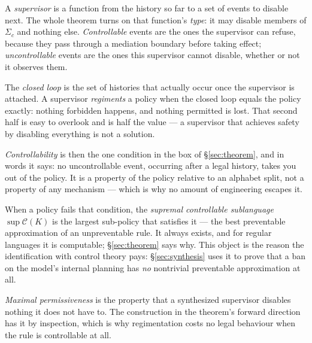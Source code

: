 \documentclass[11pt,a4paper]{article}  \usepackage{mdframed} \usepackage{graphicx} \usepackage{tabularx}
\begin{document}
A \emph{supervisor} is a function from the history so far to a set of events to disable next. The whole theorem turns on
that function's \emph{type}: it may disable members of $\Sigma_c$ and nothing else. \emph{Controllable} events are the ones
the supervisor can refuse, because they pass through a mediation boundary before taking effect; \emph{uncontrollable} events
are the ones this supervisor cannot disable, whether or not it observes them.

The \emph{closed loop} is the set of histories that actually occur once the supervisor is attached. A supervisor
\emph{regiments} a policy when the closed loop equals the policy exactly: nothing forbidden happens, and nothing permitted
is lost. That second half is easy to overlook and is half the value --- a supervisor that achieves safety by disabling
everything is not a solution.

\emph{Controllability} is then the one condition in the box of \S\ref{sec:theorem}, and in words it says: no uncontrollable
event, occurring after a legal history, takes you out of the policy. It is a property of the policy relative to an alphabet
split, not a property of any mechanism --- which is why no amount of engineering escapes it.

When a policy fails that condition, the \emph{supremal controllable sublanguage} $\sup\mathcal{C}(K)$ is the largest
sub-policy that satisfies it --- the best preventable approximation of an unpreventable rule. It always exists, and for
regular languages it is computable; \S\ref{sec:theorem} says why. This object
is the reason the identification with control theory pays: \S\ref{sec:synthesis} uses it to prove that a ban on the model's
internal planning has \emph{no} nontrivial preventable approximation at all.

\emph{Maximal permissiveness} is the property that a synthesized supervisor disables nothing it does not have to. The
construction in the theorem's forward direction has it by inspection, which is why regimentation costs no legal behaviour
when the rule is controllable at all.
\end{document}
